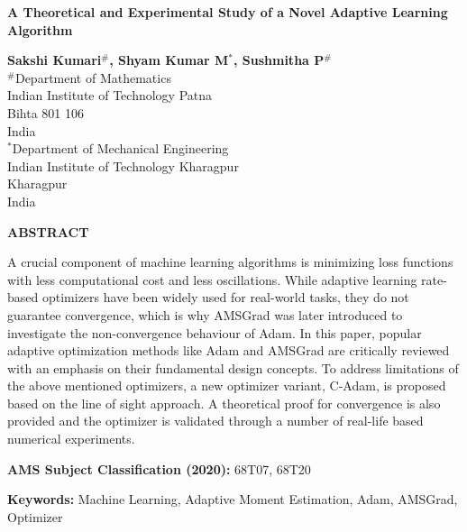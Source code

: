 \documentclass[12pt]{article}
\begin{document}
\begin{center}
\vspace{3cm}
 {\bf \large A Theoretical and Experimental Study of a Novel Adaptive Learning Algorithm}\\
\vspace{1cm}

{\bf Sakshi Kumari$^{\#}$, Shyam Kumar M$^{*}$, Sushmitha P$^{\#}$}\\
\vspace{.5cm}
$^{\#}$Department of Mathematics\\
Indian Institute of Technology Patna\\
Bihta 801 106\\
India\\

\vspace{.5cm}
$^{*}$Department of Mechanical Engineering\\
Indian Institute of Technology Kharagpur\\
Kharagpur  \\
India 
\end{center}
\vspace{1cm}
\begin{center}
    {\bf ABSTRACT}
\end{center}
A crucial component of machine learning algorithms is minimizing loss functions with less computational cost and less oscillations. While adaptive learning rate-based optimizers have been widely used for real-world tasks, they do not guarantee convergence, which is why AMSGrad was later introduced to investigate the non-convergence behaviour of Adam. In this paper, popular adaptive optimization methods like Adam and AMSGrad are critically reviewed with an emphasis on their fundamental design concepts. To address limitations of the above mentioned optimizers, a new optimizer variant, C-Adam, is proposed based on the line of sight approach. A theoretical proof for convergence is also provided and the optimizer is validated through a number of real-life based numerical experiments.
\vspace{2cm}
 
{\bf AMS Subject Classification (2020):} 68T07, 68T20 
\vspace{2cm}

{\bf Keywords:} Machine Learning, Adaptive Moment Estimation, Adam, AMSGrad, Optimizer

\newpage
\end{document}
